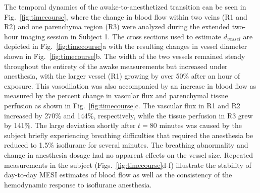 \documentclass[review]{elsarticle}
\begin{document}
The temporal dynamics of the awake-to-anesthetized transition can be seen in Fig.~\ref{fig:timecourse}, where the change in blood flow within two veins (R1 and R2) and one parenchyma region (R3) were analyzed during the extended two-hour imaging session in Subject 1. The cross sections used to estimate $d_{vessel}$ are depicted in Fig.~\ref{fig:timecourse}a with the resulting changes in vessel diameter shown in Fig.~\ref{fig:timecourse}b. The width of the two vessels remained steady throughout the entirety of the awake measurements but increased under anesthesia, with the larger vessel (R1) growing by over 50\% after an hour of exposure. This vasodilation was also accompanied by an increase in blood flow as measured by the percent change in vascular flux and parenchymal tissue perfusion as shown in Fig.~\ref{fig:timecourse}c. The vascular flux in R1 and R2 increased by 270\% and 144\%, respectively, while the tissue perfusion in R3 grew by 141\%. The large deviation shortly after $t = 80$ minutes was caused by the subject briefly experiencing breathing difficulties that required the anesthesia be reduced to 1.5\% isoflurane for several minutes. The breathing abnormality and change in anesthesia dosage had no apparent effects on the vessel size. Repeated measurements in the subject (Figs.~\ref{fig:timecourse}d-f) illustrate the stability of day-to-day MESI estimates of blood flow as well as the consistency of the hemodynamic response to isoflurane anesthesia.
\end{document}
